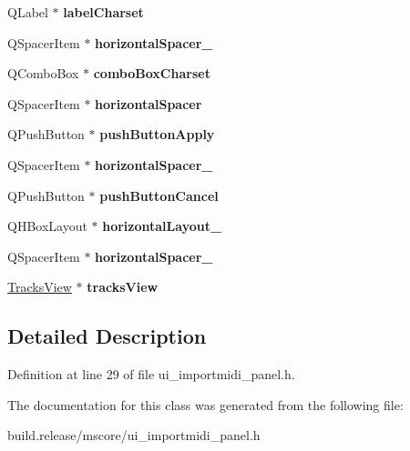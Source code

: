 \begin{DoxyCompactItemize}
\mbox{\label{class_ui___import_midi_panel_adbe8417e479b294b5226ae15a1ae60bf}} 
Q\+Label $\ast$ {\bfseries label\+Charset}
\item 
\mbox{\label{class_ui___import_midi_panel_a336888af25dc8e6b618df532584c698d}} 
Q\+Spacer\+Item $\ast$ {\bfseries horizontal\+Spacer\+\_}
\item 
\mbox{\label{class_ui___import_midi_panel_a65970ded203b9e905045a4f708b9c1a1}} 
Q\+Combo\+Box $\ast$ {\bfseries combo\+Box\+Charset}
\item 
\mbox{\label{class_ui___import_midi_panel_afb7acdccdd7e0e968c8b28d2f9a4d213}} 
Q\+Spacer\+Item $\ast$ {\bfseries horizontal\+Spacer}
\item 
\mbox{\label{class_ui___import_midi_panel_a52019756f792f51d20d0466ece0400e0}} 
Q\+Push\+Button $\ast$ {\bfseries push\+Button\+Apply}
\item 
\mbox{\label{class_ui___import_midi_panel_a4efb4d96b55bbfe0fbd3454d2cfcee78}} 
Q\+Spacer\+Item $\ast$ {\bfseries horizontal\+Spacer\+\_}
\item 
\mbox{\label{class_ui___import_midi_panel_ad673492fb0798b15e99c162a594d3d59}} 
Q\+Push\+Button $\ast$ {\bfseries push\+Button\+Cancel}
\item 
\mbox{\label{class_ui___import_midi_panel_aa87618d22eb6ab0199dcd916778e78a6}} 
Q\+H\+Box\+Layout $\ast$ {\bfseries horizontal\+Layout\+\_}
\item 
\mbox{\label{class_ui___import_midi_panel_a56ca47231e4662655d60e0e971e7e393}} 
Q\+Spacer\+Item $\ast$ {\bfseries horizontal\+Spacer\+\_}
\item 
\mbox{\label{class_ui___import_midi_panel_a68227644d2fae1614030dba855e4acbf}} 
\hyperlink{class_tracks_view}{Tracks\+View} $\ast$ {\bfseries tracks\+View}
\end{DoxyCompactItemize}


\subsection{Detailed Description}


Definition at line 29 of file ui\+\_\+importmidi\+\_\+panel.\+h.



The documentation for this class was generated from the following file\+:\begin{DoxyCompactItemize}
\item 
build.\+release/mscore/ui\+\_\+importmidi\+\_\+panel.\+h\end{DoxyCompactItemize}
